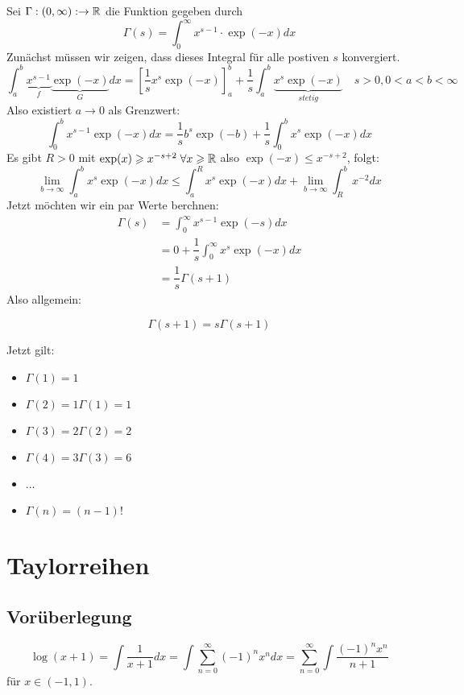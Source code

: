 \documentclass[main.tex]{subfiles}
\begin{document}
\begin{Beispiel}
  Sei $\Gamma : (0 , \infty): \to \mathbb{R}$ die Funktion gegeben durch
  $$\Gamma(s) = \int_0^\infty x^{s-1} \cdot \exp(-x)dx$$
  Zunächst müssen wir zeigen, dass dieses Integral für alle postiven $s$ konvergiert.
  $$\int_a^b \underbrace{x^{s-1}}_{f}\underbrace{\exp(-x)}_{G} dx = \left[\dfrac{1}{s}x^s \exp(-x)\right]_a^b + \dfrac{1}{s} \int_a^b \underbrace{x^s \exp(-x)}_{stetig} \quad s > 0, 0 < a < b < \infty$$
  Also existiert $a \to 0$ als Grenzwert:
  $$\int_0^b x^{s-1}\exp(-x) dx = \dfrac{1}{s}b^s \exp(-b) + \dfrac{1}{s} \int_0^b x^s \exp(-x)dx$$
  Es gibt $R > 0$ mit $\exp(x) \geqslant x^{-s+2} \;\forall x \geqslant \mathbb{R}$ also $\exp(-x)  \leq x^{-s+2}$, folgt:
  $$\lim \limits_{b \to \infty} \int_a ^b x^s \exp(-x)dx \leq \int_a^R x^s \exp(-x)dx + \lim \limits_{b \to \infty}\int_R^b x^{-2}dx$$
  Jetzt möchten wir ein par Werte berchnen:
  $$\begin{aligned}
    \Gamma(s) &= \int_0^\infty x^{s-1}\exp(-s) dx\\
    &= 0 + \dfrac{1}{s} \int_0^\infty x^s \exp(-x)dx\\
    &= \dfrac{1}{s} \Gamma(s+1)
  \end{aligned}$$
  Also allgemein:
  \begin{Theorem}
    $$\Gamma(s+1) = s \Gamma(s+1)$$
  \end{Theorem}
  Jetzt gilt:
  \begin{itemize}
    \item $\Gamma(1) = 1$
    \item $\Gamma(2) = 1 \Gamma(1) = 1$
    \item $\Gamma(3) = 2 \Gamma(2) = 2$
    \item $\Gamma(4) = 3 \Gamma(3) = 6$
    \item ...
    \item $\Gamma(n) = (n-1)!$
  \end{itemize}
\end{Beispiel}


\section{Taylorreihen}

\subsection{Vorüberlegung}

$$\log(x+1) = \int \dfrac{1}{x+1}dx = \int \sum \limits_{n=0}^\infty (-1)^n x^n dx = \sum \limits_{n=0}^\infty \int \dfrac{(-1)^n x^n}{n+1}$$
für $x \in (-1,1)$.
\end{document}
